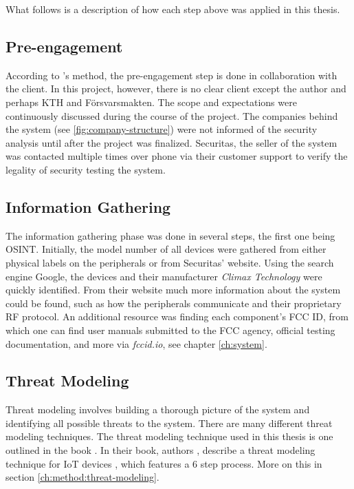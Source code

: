 What follows is a description of how each step above was applied in this thesis.

\subsection{Pre-engagement}
According to \citeauthor{weidman2014}'s method, the pre-engagement step is done in collaboration with the client. In this project, however, there is no clear client except the author and perhaps KTH and Försvarsmakten. The scope and expectations were continuously discussed during the course of the project. The companies behind the system (see \ref{fig:company-structure}) were not informed of the security analysis until after the project was finalized. Securitas, the seller of the system was contacted multiple times over phone via their customer support to verify the legality of security testing the system.

\subsection{Information Gathering}
The information gathering phase was done in several steps, the first one being \gls{OSINT}. Initially, the model number of all devices were gathered from either physical labels on the peripherals or from Securitas' website. Using the search engine Google, the devices and their manufacturer \textit{Climax Technology} were quickly identified. From their website much more information about the system could be found, such as how the peripherals communicate and their proprietary \gls{RF} protocol. An additional resource was finding each component's FCC ID, from which one can find user manuals submitted to the FCC agency, official testing documentation, and more via \textit{fccid.io}, see chapter \ref{ch:system}.

\subsection{Threat Modeling}
Threat modeling involves building a thorough picture of the system and identifying all possible threats to the system. There are many different threat modeling techniques. The threat modeling technique used in this thesis is one outlined in the book . In their book, authors \citeauthor{guzman2017iot}, describe a threat modeling technique for IoT devices \citeauthor{guzman2017iot}, which features a 6 step process. More on this in section \ref{ch:method:threat-modeling}.

